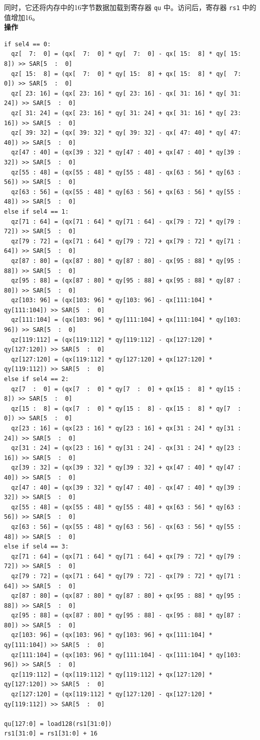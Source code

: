 同时，它还将内存中的16字节数据加载到寄存器 \lstinline{qu} 中。访问后，寄存器 \lstinline{rs1} 中的值增加16。\\
\textbf{操作}\\
\begin{lstlisting}
if sel4 == 0:
  qz[  7:  0] = (qx[  7:  0] * qy[  7:  0] - qx[ 15:  8] * qy[ 15:  8]) >> SAR[5  :  0]
  qz[ 15:  8] = (qx[  7:  0] * qy[ 15:  8] + qx[ 15:  8] * qy[  7:  0]) >> SAR[5  :  0]
  qz[ 23: 16] = (qx[ 23: 16] * qy[ 23: 16] - qx[ 31: 16] * qy[ 31: 24]) >> SAR[5  :  0]
  qz[ 31: 24] = (qx[ 23: 16] * qy[ 31: 24] + qx[ 31: 16] * qy[ 23: 16]) >> SAR[5  :  0]
  qz[ 39: 32] = (qx[ 39: 32] * qy[ 39: 32] - qx[ 47: 40] * qy[ 47: 40]) >> SAR[5  :  0]
  qz[47 : 40] = (qx[39 : 32] * qy[47 : 40] + qx[47 : 40] * qy[39 : 32]) >> SAR[5  :  0]
  qz[55 : 48] = (qx[55 : 48] * qy[55 : 48] - qx[63 : 56] * qy[63 : 56]) >> SAR[5  :  0]
  qz[63 : 56] = (qx[55 : 48] * qy[63 : 56] + qx[63 : 56] * qy[55 : 48]) >> SAR[5  :  0]
else if sel4 == 1:
  qz[71 : 64] = (qx[71 : 64] * qy[71 : 64] - qx[79 : 72] * qy[79 : 72]) >> SAR[5  :  0]
  qz[79 : 72] = (qx[71 : 64] * qy[79 : 72] + qx[79 : 72] * qy[71 : 64]) >> SAR[5  :  0]
  qz[87 : 80] = (qx[87 : 80] * qy[87 : 80] - qx[95 : 88] * qy[95 : 88]) >> SAR[5  :  0]
  qz[95 : 88] = (qx[87 : 80] * qy[95 : 88] + qx[95 : 88] * qy[87 : 80]) >> SAR[5  :  0]
  qz[103: 96] = (qx[103: 96] * qy[103: 96] - qx[111:104] * qy[111:104]) >> SAR[5  :  0]
  qz[111:104] = (qx[103: 96] * qy[111:104] + qx[111:104] * qy[103: 96]) >> SAR[5  :  0]
  qz[119:112] = (qx[119:112] * qy[119:112] - qx[127:120] * qy[127:120]) >> SAR[5  :  0]
  qz[127:120] = (qx[119:112] * qy[127:120] + qx[127:120] * qy[119:112]) >> SAR[5  :  0]
else if sel4 == 2:
  qz[7  :  0] = (qx[7  :  0] * qy[7  :  0] + qx[15 :  8] * qy[15 :  8]) >> SAR[5  :  0]
  qz[15 :  8] = (qx[7  :  0] * qy[15 :  8] - qx[15 :  8] * qy[7  :  0]) >> SAR[5  :  0]
  qz[23 : 16] = (qx[23 : 16] * qy[23 : 16] + qx[31 : 24] * qy[31 : 24]) >> SAR[5  :  0]
  qz[31 : 24] = (qx[23 : 16] * qy[31 : 24] - qx[31 : 24] * qy[23 : 16]) >> SAR[5  :  0]
  qz[39 : 32] = (qx[39 : 32] * qy[39 : 32] + qx[47 : 40] * qy[47 : 40]) >> SAR[5  :  0]
  qz[47 : 40] = (qx[39 : 32] * qy[47 : 40] - qx[47 : 40] * qy[39 : 32]) >> SAR[5  :  0]
  qz[55 : 48] = (qx[55 : 48] * qy[55 : 48] + qx[63 : 56] * qy[63 : 56]) >> SAR[5  :  0]
  qz[63 : 56] = (qx[55 : 48] * qy[63 : 56] - qx[63 : 56] * qy[55 : 48]) >> SAR[5  :  0]
else if sel4 == 3:
  qz[71 : 64] = (qx[71 : 64] * qy[71 : 64] + qx[79 : 72] * qy[79 : 72]) >> SAR[5  :  0]
  qz[79 : 72] = (qx[71 : 64] * qy[79 : 72] - qx[79 : 72] * qy[71 : 64]) >> SAR[5  :  0]
  qz[87 : 80] = (qx[87 : 80] * qy[87 : 80] + qx[95 : 88] * qy[95 : 88]) >> SAR[5  :  0]
  qz[95 : 88] = (qx[87 : 80] * qy[95 : 88] - qx[95 : 88] * qy[87 : 80]) >> SAR[5  :  0]
  qz[103: 96] = (qx[103: 96] * qy[103: 96] + qx[111:104] * qy[111:104]) >> SAR[5  :  0]
  qz[111:104] = (qx[103: 96] * qy[111:104] - qx[111:104] * qy[103: 96]) >> SAR[5  :  0]
  qz[119:112] = (qx[119:112] * qy[119:112] + qx[127:120] * qy[127:120]) >> SAR[5  :  0]
  qz[127:120] = (qx[119:112] * qy[127:120] - qx[127:120] * qy[119:112]) >> SAR[5  :  0]

qu[127:0] = load128(rs1[31:0])
rs1[31:0] = rs1[31:0] + 16

\end{lstlisting}

